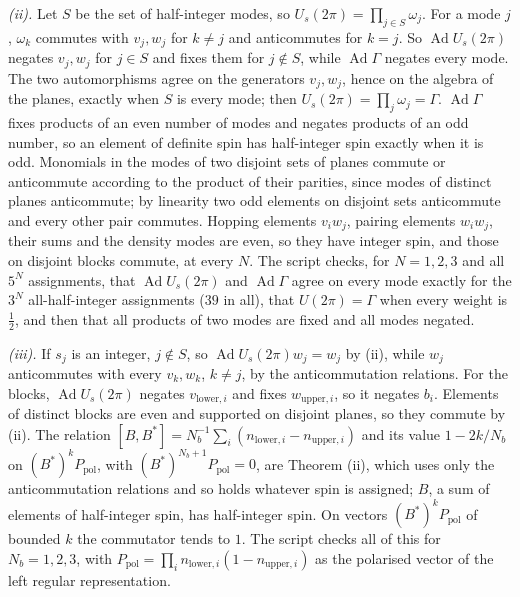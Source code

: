 \emph{(ii).} Let $S$ be the set of half-integer modes, so $U_{s}(2\pi) = \prod_{j \in S}\omega_{j}$. For a mode $j$, $\omega_{k}$ commutes with $v_{j}, w_{j}$ for $k \ne j$ and anticommutes for $k = j$. So $\operatorname{Ad}U_{s}(2\pi)$ negates $v_{j}, w_{j}$ for $j \in S$ and fixes them for $j \notin S$, while $\operatorname{Ad}\Gamma$ negates every mode. The two automorphisms agree on the generators $v_{j}, w_{j}$, hence on the algebra of the planes, exactly when $S$ is every mode; then $U_{s}(2\pi) = \prod_{j}\omega_{j} = \Gamma$. $\operatorname{Ad}\Gamma$ fixes products of an even number of modes and negates products of an odd number, so an element of definite spin has half-integer spin exactly when it is odd. Monomials in the modes of two disjoint sets of planes commute or anticommute according to the product of their parities, since modes of distinct planes anticommute; by linearity two odd elements on disjoint sets anticommute and every other pair commutes. Hopping elements $v_{i}w_{j}$, pairing elements $w_{i}w_{j}$, their sums and the density modes are even, so they have integer spin, and those on disjoint blocks commute, at every $N$. The script checks, for $N = 1, 2, 3$ and all $5^{N}$ assignments, that $\operatorname{Ad}U_{s}(2\pi)$ and $\operatorname{Ad}\Gamma$ agree on every mode exactly for the $3^{N}$ all-half-integer assignments ($39$ in all), that $U(2\pi) = \Gamma$ when every weight is $\tfrac12$, and then that all products of two modes are fixed and all modes negated.

\emph{(iii).} If $s_{j}$ is an integer, $j \notin S$, so $\operatorname{Ad}U_{s}(2\pi)w_{j} = w_{j}$ by (ii), while $w_{j}$ anticommutes with every $v_{k}, w_{k}$, $k \ne j$, by the anticommutation relations. For the blocks, $\operatorname{Ad}U_{s}(2\pi)$ negates $v_{\mathrm{lower},i}$ and fixes $w_{\mathrm{upper},i}$, so it negates $b_{i}$. Elements of distinct blocks are even and supported on disjoint planes, so they commute by (ii). The relation $[B, B^{*}] = N_{b}^{-1}\sum_{i}(n_{\mathrm{lower},i} - n_{\mathrm{upper},i})$ and its value $1 - 2k/N_{b}$ on $(B^{*})^{k}P_{\mathrm{pol}}$, with $(B^{*})^{N_{b}+1}P_{\mathrm{pol}} = 0$, are Theorem (ii), which uses only the anticommutation relations and so holds whatever spin is assigned; $B$, a sum of elements of half-integer spin, has half-integer spin. On vectors $(B^{*})^{k}P_{\mathrm{pol}}$ of bounded $k$ the commutator tends to $1$. The script checks all of this for $N_{b} = 1, 2, 3$, with $P_{\mathrm{pol}} = \prod_{i}n_{\mathrm{lower},i}(1 - n_{\mathrm{upper},i})$ as the polarised vector of the left regular representation.

